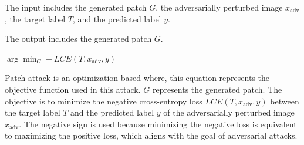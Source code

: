 
The input includes the generated patch $G$, the adversarially perturbed image $x_{\text{adv}}$, the target label $T$, and the predicted label $y$.

The output includes the generated patch $G$.

$\arg\min_{G} -LCE(T, x_{\text{adv}}, y)$

Patch attack is an optimization based where, this equation represents the objective function used in this attack. $G$ represents the generated patch. The objective is to minimize the negative cross-entropy loss $LCE(T, x_{\text{adv}}, y)$ between the target label $T$ and the predicted label $y$ of the adversarially perturbed image $x_{\text{adv}}$. The negative sign is used because minimizing the negative loss is equivalent to maximizing the positive loss, which aligns with the goal of adversarial attacks.